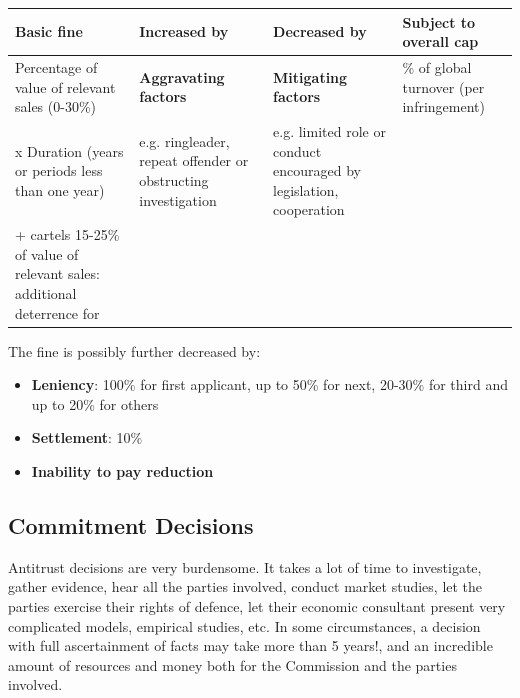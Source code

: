     \begin{tabular}{|>{\raggedright\arraybackslash}m{4cm}|>{\raggedright\arraybackslash}m{4cm}|>{\raggedright\arraybackslash}m{4cm}|>{\raggedright\arraybackslash}m{4cm}|}
    \hline
    \textbf{Basic fine} & \textbf{Increased by} & \textbf{Decreased by} & \textbf{Subject to overall cap} \\ 
    \hline
    Percentage of value of relevant sales (0-30\%) & \textbf{Aggravating factors} & \textbf{Mitigating factors} & 10\% of global turnover (per infringement) \\ 
    \hline
    x Duration (years or periods less than one year) & e.g. ringleader, repeat offender or obstructing investigation & e.g. limited role or conduct encouraged by legislation, cooperation &  \\ 
    \hline
    + cartels 15-25\% of value of relevant sales: additional deterrence for & & &  \\ 
    \hline
    \end{tabular}

    \vspace{0.3cm}

    The fine is possibly further decreased by:
    \begin{itemize}
        \item \textbf{Leniency}: 100\% for first applicant, up to 50\% for next, 20-30\% for third and up to 20\% for others
        \item \textbf{Settlement}: 10\%
        \item \textbf{Inability to pay reduction}
    \end{itemize}

\newpage
    \subsection{Commitment Decisions}

    Antitrust decisions are very burdensome. It takes a lot of time to investigate, gather evidence, hear all the parties involved, conduct market studies, let the parties exercise their rights of defence, let their economic consultant present very complicated models, empirical studies, etc. In some circumstances, a decision with full ascertainment of facts may take more than 5 years!, and an incredible amount of resources and money both for the Commission and the parties involved.

